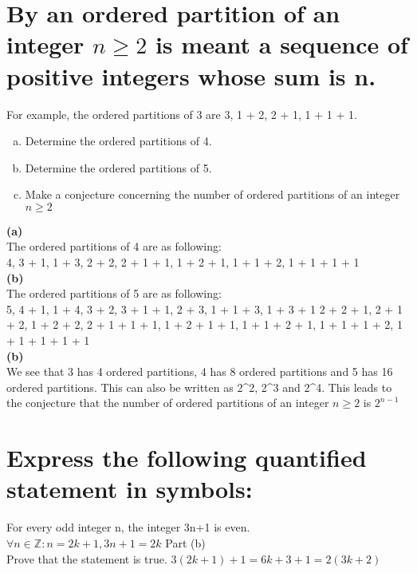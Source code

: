 \section{By an ordered partition of an integer $n\geq 2$ is meant a sequence of positive integers whose sum is n.}
For example, the ordered partitions of 3 are 3, 1 + 2, 2 + 1, 1 + 1 + 1.
\begin{enumerate}[(a)]
\item Determine the ordered partitions of 4.
\item Determine the ordered partitions of 5.
\item Make a conjecture concerning the number of ordered partitions of an integer $n\geq 2$
\end{enumerate}
\textbf{\Large(a)}\\
The ordered partitions of 4 are as following: \\
4,
 3 + 1, 1 + 3,
  2 + 2, 2 + 1 + 1, 1 + 2 + 1, 1 + 1 + 2,
   1 + 1 + 1 + 1\\
\textbf{\Large(b)}\\
The ordered partitions of 5 are as following: \\
5,
 4 + 1, 1 + 4,
  3 + 2, 3 + 1 + 1, 2 + 3, 1 + 1 + 3, 1 + 3 + 1
   2 + 2 + 1, 2 + 1 + 2, 1 + 2 + 2, 2 + 1 + 1 + 1, 1 + 2 + 1 + 1, 1 + 1 + 2 + 1, 1 + 1 + 1 + 2,
    1 + 1 + 1 + 1 + 1\\
\textbf{\Large(b)}\\
We see that 3 has 4 ordered partitions, 4 has 8 ordered partitions and 5 has 16 ordered partitions. This can also be written as 2^2, 2^3 and 2^4. This leads to the conjecture that the number of ordered partitions of an integer $n\geq 2$ is $2^{n-1}$
\section{Express the following quantified statement in symbols:}
For every odd integer n, the integer 3n+1 is even.\\
$\forall n\in \mathbb{Z} : n = 2k+1, 3n+1 = 2k$
Part (b) \\
Prove that the statement is true.
$3(2k+1)+1 = 6k +3 +1 = 2(3k+2)$

